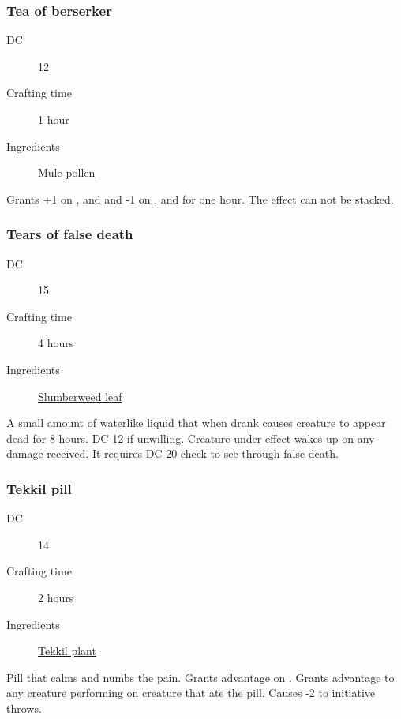 \subsubsection{Tea of berserker}
\label{Tea of berserker}

\begin{description}
\item [DC] 12 \survival
\item [Crafting time] 1 hour
\item [Ingredients] \hyperref[Mule Pollen]{Mule pollen}
\end{description}

Grants +1 on \strength, \dexterity and \constitution and -1 on \intelligence, \wisdom and \charisma{} for one hour. The effect can not be stacked.

\subsubsection{Tears of false death}
\label{Tears of false death}

\begin{description}
\item [DC] 15 \medicine
\item [Crafting time] 4 hours
\item [Ingredients] \hyperref[Slumberweed]{Slumberweed leaf}
\end{description}

A small amount of waterlike liquid that when drank causes creature to appear dead for 
8 hours. DC 12 \constitutionsave if unwilling. Creature under effect wakes up on any damage received. 
It requires DC 20 \medicine check to see through false death.

\subsubsection{Tekkil pill}
\label{Tekkil pill}

\begin{description}
\item [DC] 14 \medicine
\item [Crafting time] 2 hours
\item [Ingredients] \hyperref[Tekkil]{Tekkil plant}
\end{description}

Pill that calms and numbs the pain. Grants advantage on \constitutionsave. 
Grants advantage to any creature performing \medicine on creature that ate the pill. 
Causes -2 to initiative throws.

